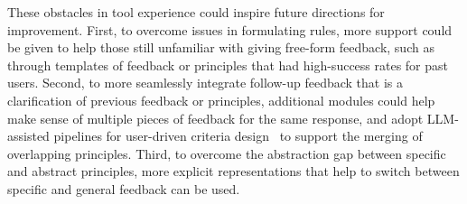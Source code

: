 \documentclass[11pt]{article}
\begin{document}
These obstacles in tool experience could inspire future directions for improvement. First, to overcome issues in formulating rules, more support could be given to help those still unfamiliar with giving free-form feedback, such as through templates of feedback or principles that had high-success rates for past users. Second, to more seamlessly integrate follow-up feedback that is a clarification of previous feedback or principles, additional modules could help make sense of multiple pieces of feedback for the same response, and adopt LLM-assisted pipelines for user-driven criteria design~\cite{kim2024evallm} to support the merging of overlapping principles. Third, to overcome the abstraction gap between specific and abstract principles, more explicit representations that help to switch between specific and general feedback can be used.  

\end{document}
